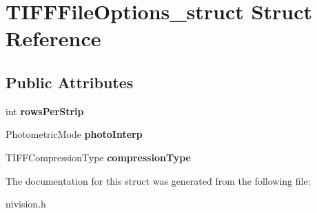 \hypertarget{structTIFFFileOptions__struct}{
\section{TIFFFileOptions\_\-struct Struct Reference}
\label{structTIFFFileOptions__struct}
}
\subsection*{Public Attributes}
\begin{DoxyCompactItemize}
\item 
\hypertarget{structTIFFFileOptions__struct_afaec3c3fc698400ae541bc01ec5e9a4e}{
int {\bfseries rowsPerStrip}}
\label{structTIFFFileOptions__struct_afaec3c3fc698400ae541bc01ec5e9a4e}

\item 
\hypertarget{structTIFFFileOptions__struct_a5221c7751b08d786905a50ae4e196f4e}{
PhotometricMode {\bfseries photoInterp}}
\label{structTIFFFileOptions__struct_a5221c7751b08d786905a50ae4e196f4e}

\item 
\hypertarget{structTIFFFileOptions__struct_aab09c7b3d6e3f251075bb8491049c529}{
TIFFCompressionType {\bfseries compressionType}}
\label{structTIFFFileOptions__struct_aab09c7b3d6e3f251075bb8491049c529}

\end{DoxyCompactItemize}


The documentation for this struct was generated from the following file:\begin{DoxyCompactItemize}
\item 
nivision.h\end{DoxyCompactItemize}
